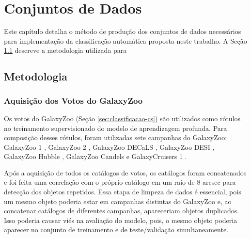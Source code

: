 \chapter{Conjuntos de Dados}
\label{sec:aquisicao}

\begin{overview}
  Este capítulo detalha o método de produção dos conjuntos de dados necessários para implementação da classificação automática proposta neste trabalho. A Seção \ref{sec:dados-metodo} descreve a metodologia utilizada para
\end{overview}





\section{Metodologia}
\label{sec:dados-metodo}

\lipsum[1]


\subsection{Aquisição dos Votos do GalaxyZoo}
\label{sec:aquisicao-zoo}

Os votos do GalaxyZoo (Seção \ref{sec:classificacao-cs}) são utilizados como rótulos no treinamento supervisionado do modelo de aprendizagem profunda. Para composição desses rótulos, foram utilizadas sete campanhas do GalaxyZoo: GalaxyZoo 1 \cite{gz1}, GalaxyZoo 2 \cite{gz2,gz2-bias}, GalaxyZoo DECaLS \cite{gz-decals}, GalaxyZoo DESI \cite{gz-desi}, GalaxyZoo Hubble \cite{gz-hubble}, GalaxyZoo Candels \cite{gz-candels} e GalaxyCruisers 1 \cite{gc1}.

Após a aquisição de todos os catálogos de votos, os catálogos foram concatenados e foi feita uma correlação com o próprio catálogo em um raio de 8 arcsec para detecção dos objetos repetidos. Essa etapa de limpeza de dados é essencial, pois um mesmo objeto poderia estar em campanhas distintas do GalaxyZoo e, ao concatenar catálogos de diferentes campanhas, apareceriam objetos duplicados. Isso poderia causar viés na avaliação do modelo, pois, o mesmo objeto poderia aparecer no conjunto de treinamento e de teste/validação simultaneamente.

